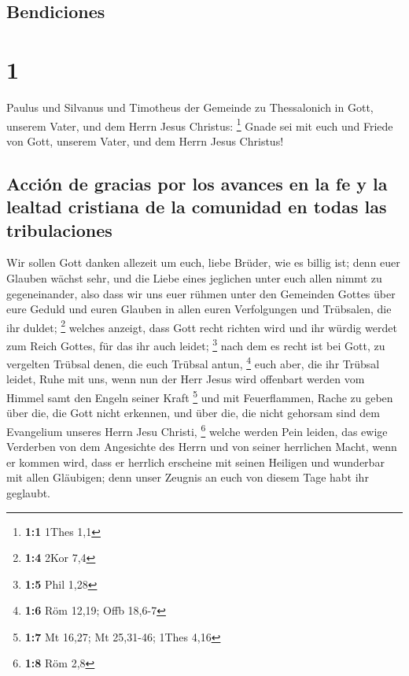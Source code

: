 \hypertarget{bendiciones}{%
\subsection{Bendiciones}\label{bendiciones}}

\hypertarget{section}{%
\section{1}\label{section}}

 Paulus und Silvanus und Timotheus der Gemeinde zu
Thessalonich in Gott, unserem Vater, und dem Herrn Jesus Christus:
\footnote{\textbf{1:1} 1Thes 1,1}  Gnade sei mit euch und
Friede von Gott, unserem Vater, und dem Herrn Jesus Christus!

\hypertarget{acciuxf3n-de-gracias-por-los-avances-en-la-fe-y-la-lealtad-cristiana-de-la-comunidad-en-todas-las-tribulaciones}{%
\subsection{Acción de gracias por los avances en la fe y la lealtad
cristiana de la comunidad en todas las
tribulaciones}\label{acciuxf3n-de-gracias-por-los-avances-en-la-fe-y-la-lealtad-cristiana-de-la-comunidad-en-todas-las-tribulaciones}}

 Wir sollen Gott danken allezeit um euch, liebe Brüder,
wie es billig ist; denn euer Glauben wächst sehr, und die Liebe eines
jeglichen unter euch allen nimmt zu gegeneinander,  also
dass wir uns euer rühmen unter den Gemeinden Gottes über eure Geduld und
euren Glauben in allen euren Verfolgungen und Trübsalen, die ihr duldet;
\footnote{\textbf{1:4} 2Kor 7,4}  welches anzeigt, dass
Gott recht richten wird und ihr würdig werdet zum Reich Gottes, für das
ihr auch leidet; \footnote{\textbf{1:5} Phil 1,28}  nach
dem es recht ist bei Gott, zu vergelten Trübsal denen, die euch Trübsal
antun, \footnote{\textbf{1:6} Röm 12,19; Offb 18,6-7} 
euch aber, die ihr Trübsal leidet, Ruhe mit uns, wenn nun der Herr Jesus
wird offenbart werden vom Himmel samt den Engeln seiner Kraft
\footnote{\textbf{1:7} Mt 16,27; Mt 25,31-46; 1Thes 4,16} 
und mit Feuerflammen, Rache zu geben über die, die Gott nicht erkennen,
und über die, die nicht gehorsam sind dem Evangelium unseres Herrn Jesu
Christi, \footnote{\textbf{1:8} Röm 2,8}  welche werden
Pein leiden, das ewige Verderben von dem Angesichte des Herrn und von
seiner herrlichen Macht,  wenn er kommen wird, dass er
herrlich erscheine mit seinen Heiligen und wunderbar mit allen
Gläubigen; denn unser Zeugnis an euch von diesem Tage habt ihr geglaubt.

